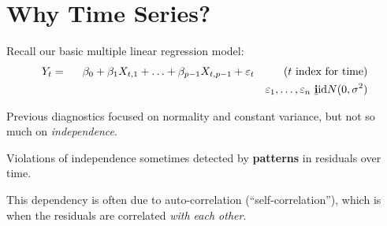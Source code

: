 \documentclass[12pt]{../notes}
\begin{document}

\section{Why Time Series?}
Recall our basic multiple linear regression model:
\begin{eqnarray}
  Y_t & = & \beta_0 + \beta_1 X_{t,1} + \ldots + \beta_{p-1} X_{t,p-1} + \varepsilon_t  \mbox{ \hspace{2em}  ($t$ index for time)} \nonumber\\
  & & \mbox{ \hspace{17em}} \varepsilon_1, \ldots, \varepsilon_n \mbox{ {\bf \underline{i}}id} N(0,\sigma^2) \nonumber
\end{eqnarray}

Previous diagnostics focused on normality and constant variance, but not so much on \textit{independence}. 

\vspace{1em}
Violations of independence sometimes detected by \textbf{patterns} in residuals over time. 

\vspace{1em}
This dependency is often due to auto-correlation (``self-correlation''), which is when the residuals are correlated \textit{with each other}. 


\begin{minipage}[l][2cm][c]{\textwidth}
\end{minipage}


\begin{minipage}[l][3cm][c]{\textwidth}
\end{minipage}
\end{document}
